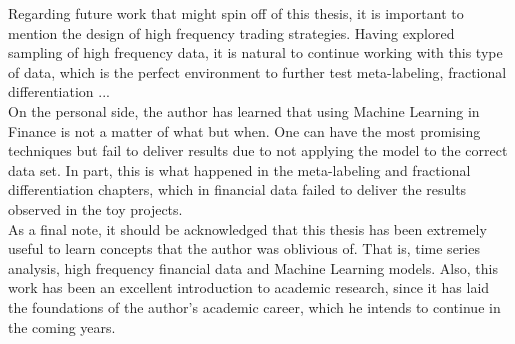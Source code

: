 Regarding future work that might spin off of this thesis, it is important to 
mention the design of high frequency trading strategies. Having explored 
sampling of high frequency data, it is natural to continue working with this 
type of data, which is the perfect environment to further test 
meta-labeling, fractional differentiation ...\\

On the personal side, the author has learned that using Machine Learning in 
Finance is not a matter of what but when. One can have the most promising 
techniques but fail to deliver results due to not applying the model to the 
correct data set. In part, this is what happened in the meta-labeling and 
fractional differentiation chapters, which in financial data failed to 
deliver the results observed in the toy projects.\\

As a final note, it should be acknowledged that this thesis has been 
extremely useful to learn concepts that the author was oblivious of. That is, 
time series analysis, high frequency financial data and Machine Learning 
models. Also, this work has been an excellent introduction to academic 
research, since it has laid the foundations of the author's academic career, 
which he intends to continue in the coming years.